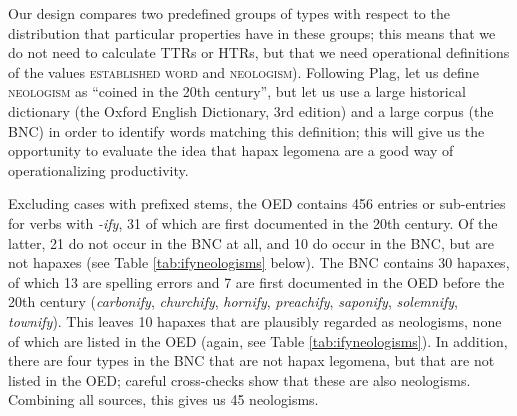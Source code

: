 Our design compares two predefined groups of types with respect to the distribution that particular properties have in these groups; this means that we do not need to calculate TTRs or HTRs, but that we need operational definitions of the values \textsc{established word} and \textsc{neologism}). Following Plag, let us define \textsc{neologism} as ``coined in the 20th century'', but let us use a large historical dictionary (the Oxford English Dictionary, 3rd edition) and a large corpus (the BNC) in order to identify words matching this definition; this will give us the opportunity to evaluate the idea that hapax legomena are a good way of operationalizing productivity.

Excluding cases with prefixed stems, the OED contains 456 entries or sub-entries for verbs with \textit{-ify}, 31 of which are first documented in the 20th century. Of the latter, 21 do not occur in the BNC at all, and 10 do occur in the BNC, but are not hapaxes (see Table \ref{tab:ifyneologisms} below). The BNC contains 30 hapaxes, of which 13 are spelling errors and 7 are first documented in the OED before the 20th century (\textit{carbonify}, \textit{churchify}, \textit{hornify}, \textit{preachify}, \textit{saponify}, \textit{solemnify}, \textit{townify}). This leaves 10 hapaxes that are plausibly regarded as neologisms, none of which are listed in the OED (again, see Table \ref{tab:ifyneologisms}). In addition, there are four types in the BNC that are not hapax legomena, but that are not listed in the OED; careful cross-checks show that these are also neologisms. Combining all sources, this gives us 45 neologisms.

